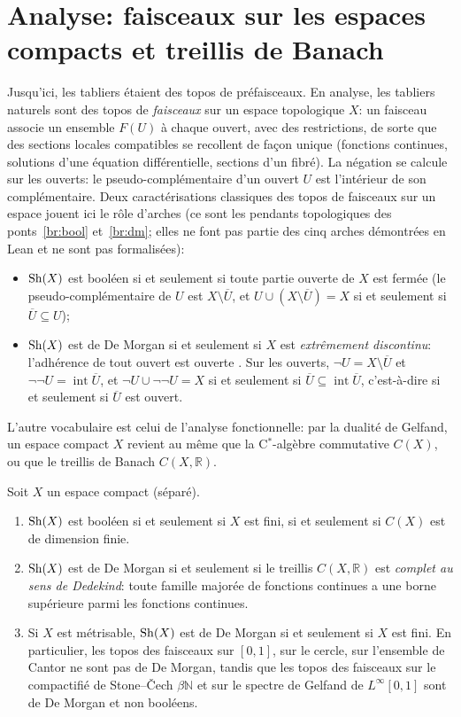 \section{Analyse: faisceaux sur les espaces compacts et treillis de Banach}\label{sec:analysis}

Jusqu'ici, les tabliers étaient des topos de préfaisceaux. En analyse, les tabliers naturels sont des topos de \emph{faisceaux} sur un espace topologique $X$: un faisceau associe un ensemble $F(U)$ à chaque ouvert, avec des restrictions, de sorte que des sections locales compatibles se recollent de façon unique (fonctions continues, solutions d'une équation différentielle, sections d'un fibré). La négation se calcule sur les ouverts: le pseudo-complémentaire d'un ouvert $U$ est l'intérieur de son complémentaire. Deux caractérisations classiques des topos de faisceaux sur un espace jouent ici le rôle d'arches (ce sont les pendants topologiques des ponts~\ref{br:bool} et~\ref{br:dm}; elles ne font pas partie des cinq arches démontrées en Lean et ne sont pas formalisées):
\begin{itemize}
\item $\mathrm{Sh}(X)$ est booléen si et seulement si toute partie ouverte de $X$ est fermée (le pseudo-complémentaire de $U$ est $X\setminus\overline U$, et $U\cup(X\setminus\overline U) = X$ si et seulement si $\overline U\subseteq U$);
\item $\mathrm{Sh}(X)$ est de De Morgan si et seulement si $X$ est \emph{extrêmement discontinu}: l'adhérence de tout ouvert est ouverte \cite{johnstone-demorgan}. Sur les ouverts, $\neg U = X\setminus\overline U$ et $\neg\neg U = \operatorname{int}\overline U$, et $\neg U\cup\neg\neg U = X$ si et seulement si $\overline U\subseteq\operatorname{int}\overline U$, c'est-à-dire si et seulement si $\overline U$ est ouvert.
\end{itemize}
L'autre vocabulaire est celui de l'analyse fonctionnelle: par la dualité de Gelfand, un espace compact $X$ revient au même que la C$^*$-algèbre commutative $C(X)$, ou que le treillis de Banach $C(X,\mathbb R)$.

\begin{theorem}\label{th:analysis}
Soit $X$ un espace compact (séparé).
\begin{enumerate}
\item $\mathrm{Sh}(X)$ est booléen si et seulement si $X$ est fini, si et seulement si $C(X)$ est de dimension finie.
\item $\mathrm{Sh}(X)$ est de De Morgan si et seulement si le treillis $C(X,\mathbb R)$ est \emph{complet au sens de Dedekind}: toute famille majorée de fonctions continues a une borne supérieure parmi les fonctions continues.
\item Si $X$ est métrisable, $\mathrm{Sh}(X)$ est de De Morgan si et seulement si $X$ est fini. En particulier, les topos des faisceaux sur $[0,1]$, sur le cercle, sur l'ensemble de Cantor ne sont pas de De Morgan, tandis que les topos des faisceaux sur le compactifié de Stone--Čech $\beta\mathbb N$ et sur le spectre de Gelfand de $L^\infty[0,1]$ sont de De Morgan et non booléens.
\end{enumerate}
\end{theorem}

